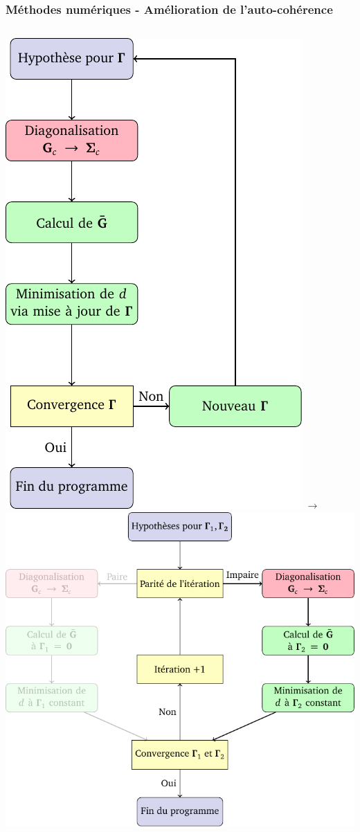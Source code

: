 \begin{frame}
    \frametitle{Méthodes numériques - Amélioration de l'auto-cohérence}
    \begin{columns}
        \includegraphics[scale=0.45]{./figures/theory/flow_chart.pdf}
        $\longrightarrow$
        \includegraphics[scale=0.45]{./figures/theory/flow_chart_virtual_impair.pdf}
    \end{columns}
\end{frame}


